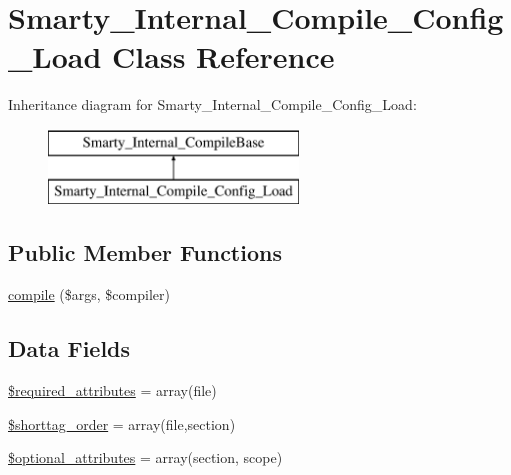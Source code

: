 \hypertarget{class_smarty___internal___compile___config___load}{}\section{Smarty\+\_\+\+Internal\+\_\+\+Compile\+\_\+\+Config\+\_\+\+Load Class Reference}
\label{class_smarty___internal___compile___config___load}
Inheritance diagram for Smarty\+\_\+\+Internal\+\_\+\+Compile\+\_\+\+Config\+\_\+\+Load\+:\begin{figure}[H]
\begin{center}
\leavevmode
\includegraphics[height=2.000000cm]{class_smarty___internal___compile___config___load}
\end{center}
\end{figure}
\subsection*{Public Member Functions}
\begin{DoxyCompactItemize}
\item 
\hyperlink{class_smarty___internal___compile___config___load_ad72fac0effa74aadee9b5ef6aed5f69f}{compile} (\$args, \$compiler)
\end{DoxyCompactItemize}
\subsection*{Data Fields}
\begin{DoxyCompactItemize}
\item 
\hyperlink{class_smarty___internal___compile___config___load_ae799507d5461de485f3a618abeecea95}{\$required\+\_\+attributes} = array(\textquotesingle{}file\textquotesingle{})
\item 
\hyperlink{class_smarty___internal___compile___config___load_a2ccb25269c3a92e8c4796c7ef23725e6}{\$shorttag\+\_\+order} = array(\textquotesingle{}file\textquotesingle{},\textquotesingle{}section\textquotesingle{})
\item 
\hyperlink{class_smarty___internal___compile___config___load_a899d1eb4a6fecbd6ce696adb171c80a4}{\$optional\+\_\+attributes} = array(\textquotesingle{}section\textquotesingle{}, \textquotesingle{}scope\textquotesingle{})
\end{DoxyCompactItemize}


